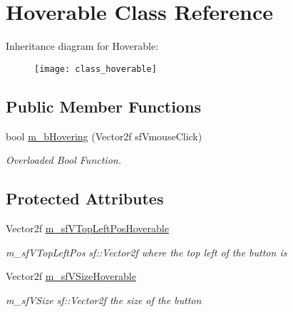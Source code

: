 \hypertarget{class_hoverable}{}\section{Hoverable Class Reference}
\label{class_hoverable}
Inheritance diagram for Hoverable\+:\begin{figure}[H]
\begin{center}
\leavevmode
\texttt{[image: class\_hoverable]}
\end{center}
\end{figure}
\subsection*{Public Member Functions}
\begin{DoxyCompactItemize}
\item 
bool \hyperlink{class_hoverable_a5b2698e36a45fc22a0a45c74608213c5}{m\+\_\+b\+Hovering} (Vector2f sf\+Vmouse\+Click)
\begin{DoxyCompactList}\small\item\em Overloaded Bool Function. \end{DoxyCompactList}\end{DoxyCompactItemize}
\subsection*{Protected Attributes}
\begin{DoxyCompactItemize}
\item 
\hypertarget{class_hoverable_a890c220cc9b6929f72853454aa96cc73}{}\label{class_hoverable_a890c220cc9b6929f72853454aa96cc73} 
Vector2f \hyperlink{class_hoverable_a890c220cc9b6929f72853454aa96cc73}{m\+\_\+sf\+V\+Top\+Left\+Pos\+Hoverable}
\begin{DoxyCompactList}\small\item\em m\+\_\+sf\+V\+Top\+Left\+Pos sf\+::\+Vector2f where the top left of the button is \end{DoxyCompactList}\item 
\hypertarget{class_hoverable_a5134e5e8ed1b8d0d3ba7a0a05fb1f955}{}\label{class_hoverable_a5134e5e8ed1b8d0d3ba7a0a05fb1f955} 
Vector2f \hyperlink{class_hoverable_a5134e5e8ed1b8d0d3ba7a0a05fb1f955}{m\+\_\+sf\+V\+Size\+Hoverable}
\begin{DoxyCompactList}\small\item\em m\+\_\+sf\+V\+Size sf\+::\+Vector2f the size of the button \end{DoxyCompactList}\end{DoxyCompactItemize}


